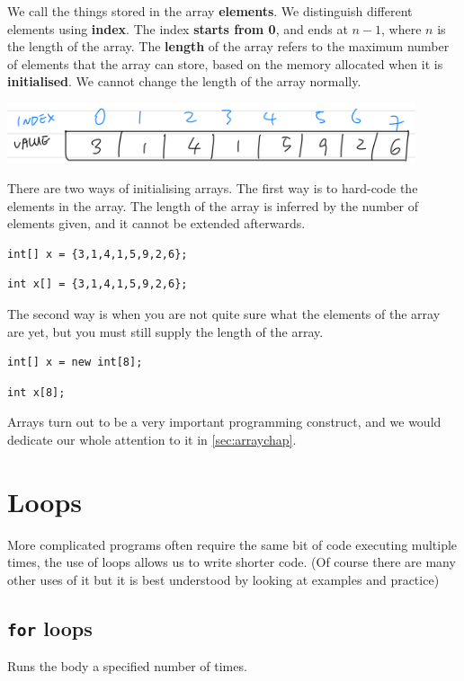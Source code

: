 We call the things stored in the array \textbf{elements}. We distinguish different elements using \textbf{index}. The index \textbf{starts from 0}, and ends at $n-1$, where $n$ is the length of the array. The \textbf{length} of the array refers to the maximum number of elements that the array can store, based on the memory allocated when it is \textbf{initialised}. We cannot change the length of the array normally.

\includegraphics[width=12cm]{images/ch2-arrayindex.png}

There are two ways of initialising arrays. The first way is to hard-code the elements in the array. The length of the array is inferred by the number of elements given, and it cannot be extended afterwards.

\if{}
\begin{lstlisting}
int[] x = {3,1,4,1,5,9,2,6};
\end{lstlisting}
\else
\begin{lstlisting}
int x[] = {3,1,4,1,5,9,2,6};
\end{lstlisting}
\fi

The second way is when you are not quite sure what the elements of the array are yet, but you must still supply the length of the array.

\if{}
\begin{lstlisting}
int[] x = new int[8];
\end{lstlisting}
\else
\begin{lstlisting}
int x[8];
\end{lstlisting}
\fi

Arrays turn out to be a very important programming construct, and we would dedicate our whole attention to it in \cref{sec:arraychap}.

\section{Loops}

More complicated programs often require the same bit of code executing multiple times, the use of loops allows us to write shorter code. (Of course there are many other uses of it but it is best understood by looking at examples and practice)

\subsection{\texttt{for} loops}
\label{sec:forloops}
Runs the body a specified number of times.


